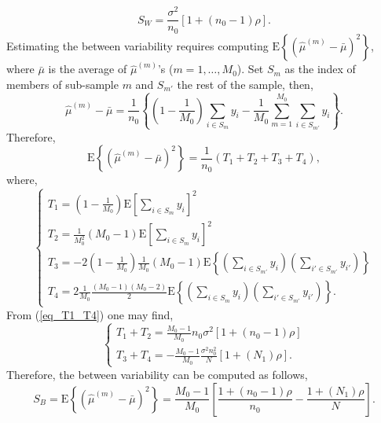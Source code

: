\documentclass[11pt,a5paper,twoside]{book}
\begin{document}
{\begin{equation}
\label{within}
S_W= \frac{\sigma^2}{n_0} \left[ 1+ (n_0-1) \rho \right ].
\end{equation}
Estimating the between variability requires computing $\mathrm{E}\left\{ (\widehat{\mu}^{(m)} - \bar{\mu})^2 \right\}$, where $\bar{\mu}$ is the average of $\widehat{\mu}^{(m)}$'s ($m=1,\ldots,M_0$). Set $S_m$ as the index of members of sub-sample $m$ and $S_{m'}$ the rest of the sample, then,
\begin{equation*}
\widehat{\mu}^{(m)} - \bar{\mu} = \frac{1}{n_0}\left\{(1-\frac{1}{M_0})\sum_{i\in S_m} y_i - \frac{1}{M_0} \sum_{m=1}^ {M_0} \sum_{i\in S_{m'}} y_i \right\}.
\end{equation*}
Therefore,
\begin{equation}
\label{T1_T4}
\mathrm{E}\left\{(\widehat{\mu}^{(m)} - \bar{\mu})^2 \right\} = \frac{1}{n_0} \left( T_1 + T_2 + T_3+ T_4\right),
\end{equation}
where,
\begin{equation}
\label{eq_T1_T4}
\begin{cases}
T_1= \left( 1- \frac{1}{M_0} \right) \mathrm{E} \left [ \sum_{i\in S_m} y_i \right]^2\\
T_2= \frac{1}{M_0^2} (M_0-1) \mathrm{E} \left[ \sum_{i \in S_m} y_i \right]^2\\
T_3=  -2 \left(1-\frac{1}{M_0} \right) \frac{1}{M_0} (M_0-1) \mathrm{E} \left\{ \left(\sum_{i\in S_{m'}} y_i \right) \left( \sum_{i'\in S_{m'}} y_{i'} \right) \right\} \\
T_4= 2 \frac{1}{M_0} \frac{(M_0-1) (M_0-2)}{2} \mathrm{E} \left\{ \left(\sum_{i \in S_m} y_i \right) \left(\sum_{i'\in S_{m'}} y_{i'} \right) \right\}.
\end{cases}
\end{equation}
From (\ref{eq_T1_T4}) one may find,
\begin{equation}
\label{sum_T}
\begin{cases}
T_1+ T_2 = \frac{M_0-1}{M_0} n_0 \sigma^2 \left [1+ (n_0-1) \rho \right]\\
T_3 + T_4= - \frac{M_0-1}{M_0} \frac{\sigma^2 n_0^2}{N} \left[ 1+ (N_1) \rho \right].
\end{cases}
\end{equation}
Therefore, the between variability can be computed as follows,
\begin{equation}
\label{between}
S_B=\mathrm{E} \left\{ (\widehat{\mu}^{(m)} - \bar{\mu} )^2 \right\} = \frac{M_0-1}{M_0} \left[\frac{1+(n_0-1)\rho}{n_0} - \frac{1+(N_1)\rho}{N} \right].

\end{equation}}
\end{document}
